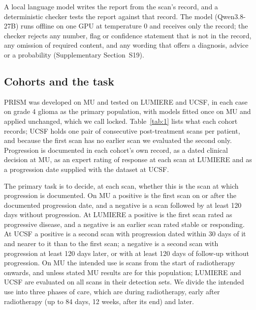 \documentclass[largeformat]{interact} %
\begin{document}
A local language model writes the report from the scan's record, and a deterministic checker tests the report
against that record. The model (Qwen3.8-27B) runs offline on one GPU at temperature 0 and receives only the record; the checker
rejects any number, flag or confidence statement that is not in the record, any omission of required content, and any
wording that offers a diagnosis, advice or a probability (Supplementary Section~S19).

\subsection{Cohorts and the task}\label{sec:2.2}

PRISM was developed on MU and tested on LUMIERE and UCSF, in each case on grade 4 glioma as the primary population,
with models fitted once on MU and applied unchanged, which we call locked. Table~\ref{tab:1} lists what each cohort
records; UCSF holds one pair of consecutive post-treatment scans per patient, and because the first scan has no earlier
scan we evaluated the second only. Progression is documented in each cohort's own record, as a dated clinical decision
at MU, as an expert rating of response at each scan at LUMIERE and as a progression date supplied with the dataset at
UCSF.

The primary task is to decide, at each scan, whether this is the scan at which progression is documented. On MU a positive is the first
scan on or after the documented progression date, and a negative is a scan followed by at least 120 days without
progression. At LUMIERE a positive is the first scan rated as progressive disease, and a negative is an earlier scan
rated stable or responding. At UCSF a positive is a second scan with progression dated within 30 days of it and
nearer to it than to the first scan; a negative is a second scan with progression at least 120 days later, or with at
least 120 days of follow-up without progression. On MU the intended use is scans from the start of radiotherapy
onwards, and unless stated MU results are for this population; LUMIERE and UCSF are evaluated on all scans in their
detection sets. We divide the intended use into three phases of care, which are during radiotherapy, early after radiotherapy (up
to 84 days, 12 weeks, after its end) and later.
\end{document}
